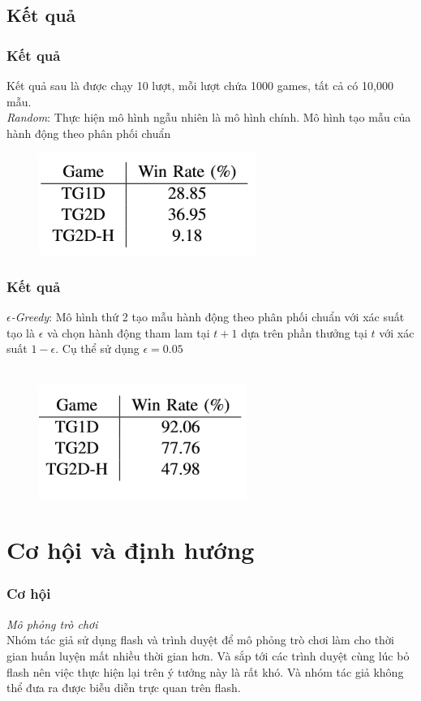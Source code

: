 \documentclass{beamer}
\begin{document}
\subsection{Kết quả}
\begin{frame}
\frametitle{Kết quả}
Kết quả sau là được chạy 10 lượt, mỗi lượt chứa 1000 games, tất cả có 10,000 mẫu.\\
\textit{Random}: Thực hiện mô hình ngẫu nhiên là mô hình chính. Mô hình tạo mẫu của hành động theo phân phối chuẩn
\begin{figure}[h!]
    \centering
    \includegraphics{photo/result1.png}
\end{figure}
\end{frame}

\begin{frame}
\frametitle{Kết quả}
\textit{$\epsilon$-Greedy}: Mô hình thứ 2 tạo mẫu hành động theo phân phối chuẩn với xác suất tạo là $\epsilon$ và chọn hành động tham lam tại $t+1$ dựa trên phần thưởng tại $t$ với xác suất $1-\epsilon$. Cụ thể sử dụng $\epsilon=0.05$
\\
\\
\begin{figure}[h]
    \centering
    \includegraphics{photo/result2.png}
\end{figure}
\end{frame}

\section{Cơ hội và định hướng}
\begin{frame}
\frametitle{Cơ hội}
\textit{Mô phỏng trò chơi}\\
Nhóm tác giả sử dụng flash và trình duyệt để mô phỏng trò chơi làm cho thời gian huấn luyện mất nhiều thời gian hơn. Và sắp tới các trình duyệt cùng lúc bỏ flash nên việc thực hiện lại trên ý tưởng này là rất khó. Và nhóm tác giả không thể đưa ra được biễu diễn trực quan trên flash.\\
\end{frame}
\end{document}
